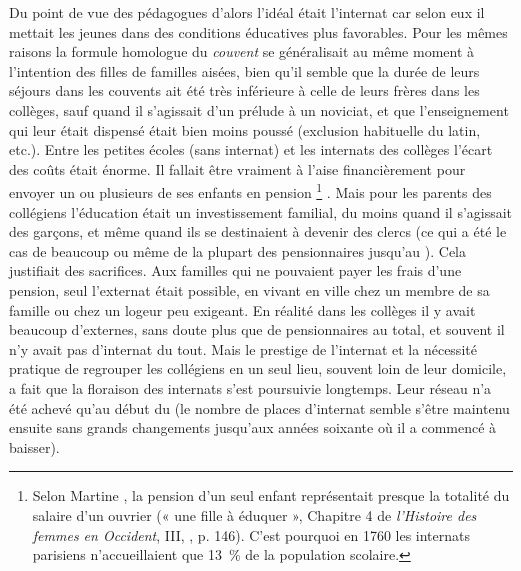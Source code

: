  Du point de vue des pédagogues d'alors l'idéal était l'internat car selon eux il mettait les jeunes dans des conditions éducatives plus favorables. Pour les mêmes raisons la formule homologue du \emph{couvent} se généralisait au même moment à l'intention des filles de familles aisées, bien qu'il semble que la durée de leurs séjours dans les couvents ait été très inférieure à celle de leurs frères dans les collèges, sauf quand il s'agissait d'un prélude à un noviciat, et que l'enseignement qui leur était dispensé était bien moins poussé (exclusion habituelle du latin, etc.). Entre les petites écoles (sans internat) et les internats des collèges l'écart des coûts était énorme. Il fallait être vraiment à l'aise financièrement pour envoyer un ou plusieurs de ses enfants en pension%
\footnote{Selon Martine , la pension d'un seul enfant représentait presque la totalité du salaire d'un ouvrier (« une fille à éduquer », Chapitre 4 de \emph{l'Histoire des femmes en Occident}, III, , p. 146). C'est pourquoi en 1760 les internats parisiens n'accueillaient que 13~\% de la population scolaire.}%
. Mais pour les parents des collégiens l'éducation était un investissement familial, du moins quand il s'agissait des garçons, et même quand ils se destinaient à devenir des clercs (ce qui a été le cas de beaucoup ou même de la plupart des pensionnaires jusqu'au ). Cela justifiait des sacrifices. Aux familles qui ne pouvaient payer les frais d'une pension, seul l'externat était possible, en vivant en ville chez un membre de sa famille ou chez un logeur peu exigeant. En réalité dans les collèges il y avait beaucoup d'externes, sans doute plus que de pensionnaires au total, et souvent il n'y avait pas d'internat du tout. Mais le prestige de l'internat et la nécessité pratique de regrouper les collégiens en un seul lieu, souvent loin de leur domicile, a fait que la floraison des internats s'est poursuivie longtemps. Leur réseau n'a été achevé qu'au début du  (le nombre de places d'internat semble s'être maintenu ensuite sans grands changements jusqu'aux années soixante où il a commencé à baisser). 

